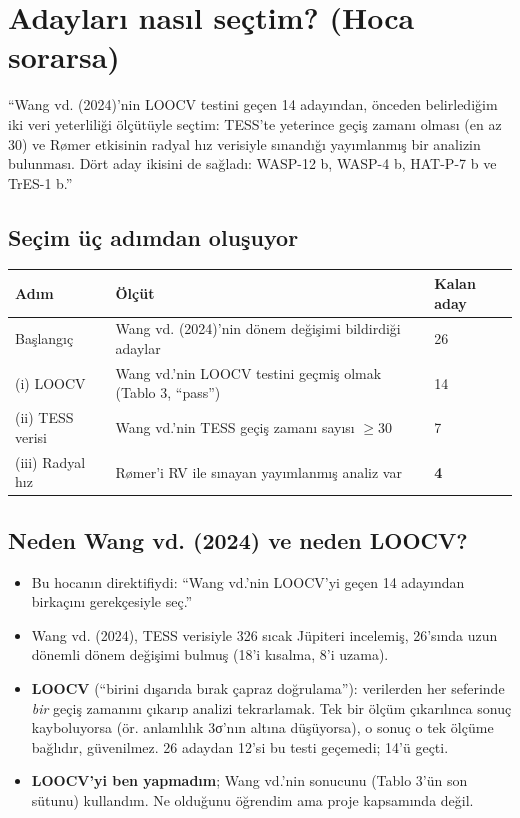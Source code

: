 \documentclass[11pt,a4paper]{article}
\newcounter{sor}[section]
\begin{document}
\section{Adayları nasıl seçtim? (Hoca sorarsa)}

\begin{soyle}
``Wang vd. (2024)'nin LOOCV testini geçen 14 adayından, önceden belirlediğim iki veri yeterliliği ölçütüyle seçtim: TESS'te yeterince geçiş zamanı olması (en az 30) ve Rømer etkisinin radyal hız verisiyle sınandığı yayımlanmış bir analizin bulunması. Dört aday ikisini de sağladı: WASP-12 b, WASP-4 b, HAT-P-7 b ve TrES-1 b.''
\end{soyle}

\subsection{Seçim üç adımdan oluşuyor}

\begin{center}
\begin{tabular}{@{}lll@{}}
\toprule
Adım & Ölçüt & Kalan aday \\ \midrule
Başlangıç & Wang vd. (2024)'nin dönem değişimi bildirdiği adaylar & 26 \\
(i) LOOCV & Wang vd.'nin LOOCV testini geçmiş olmak (Tablo 3, ``pass'') & 14 \\
(ii) TESS verisi & Wang vd.'nin TESS geçiş zamanı sayısı $\geq 30$ & 7 \\
(iii) Radyal hız & Rømer'i RV ile sınayan yayımlanmış analiz var & \textbf{4} \\ \bottomrule
\end{tabular}
\end{center}

\subsection{Neden Wang vd. (2024) ve neden LOOCV?}
\begin{itemize}
\item Bu hocanın direktifiydi: ``Wang vd.'nin LOOCV'yi geçen 14 adayından birkaçını gerekçesiyle seç.''
\item Wang vd. (2024), TESS verisiyle 326 sıcak Jüpiteri incelemiş, 26'sında uzun dönemli dönem değişimi bulmuş (18'i kısalma, 8'i uzama).
\item \textbf{LOOCV} (``birini dışarıda bırak çapraz doğrulama''): verilerden her seferinde \emph{bir} geçiş zamanını çıkarıp analizi tekrarlamak. Tek bir ölçüm çıkarılınca sonuç kayboluyorsa (ör. anlamlılık 3σ'nın altına düşüyorsa), o sonuç o tek ölçüme bağlıdır, güvenilmez. 26 adaydan 12'si bu testi geçemedi; 14'ü geçti.
\item \textbf{LOOCV'yi ben yapmadım}; Wang vd.'nin sonucunu (Tablo 3'ün son sütunu) kullandım. Ne olduğunu öğrendim ama proje kapsamında değil.
\end{itemize}
\end{document}
